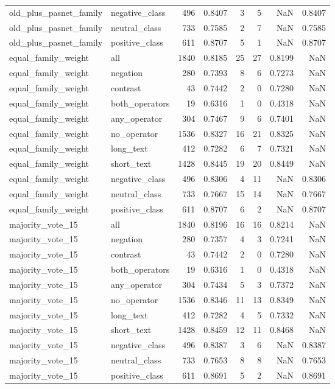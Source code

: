 \begin{tabular}{llrrrrrr}
old\_plus\_pasnet\_family & negative\_class & 496 & 0.8407 & 3 & 5 & NaN & 0.8407 \\
old\_plus\_pasnet\_family & neutral\_class & 733 & 0.7585 & 2 & 7 & NaN & 0.7585 \\
old\_plus\_pasnet\_family & positive\_class & 611 & 0.8707 & 5 & 1 & NaN & 0.8707 \\
equal\_family\_weight & all & 1840 & 0.8185 & 25 & 27 & 0.8199 & NaN \\
equal\_family\_weight & negation & 280 & 0.7393 & 8 & 6 & 0.7273 & NaN \\
equal\_family\_weight & contrast & 43 & 0.7442 & 2 & 0 & 0.7280 & NaN \\
equal\_family\_weight & both\_operators & 19 & 0.6316 & 1 & 0 & 0.4318 & NaN \\
equal\_family\_weight & any\_operator & 304 & 0.7467 & 9 & 6 & 0.7401 & NaN \\
equal\_family\_weight & no\_operator & 1536 & 0.8327 & 16 & 21 & 0.8325 & NaN \\
equal\_family\_weight & long\_text & 412 & 0.7282 & 6 & 7 & 0.7321 & NaN \\
equal\_family\_weight & short\_text & 1428 & 0.8445 & 19 & 20 & 0.8449 & NaN \\
equal\_family\_weight & negative\_class & 496 & 0.8306 & 4 & 11 & NaN & 0.8306 \\
equal\_family\_weight & neutral\_class & 733 & 0.7667 & 15 & 14 & NaN & 0.7667 \\
equal\_family\_weight & positive\_class & 611 & 0.8707 & 6 & 2 & NaN & 0.8707 \\
majority\_vote\_15 & all & 1840 & 0.8196 & 16 & 16 & 0.8214 & NaN \\
majority\_vote\_15 & negation & 280 & 0.7357 & 4 & 3 & 0.7241 & NaN \\
majority\_vote\_15 & contrast & 43 & 0.7442 & 2 & 0 & 0.7280 & NaN \\
majority\_vote\_15 & both\_operators & 19 & 0.6316 & 1 & 0 & 0.4318 & NaN \\
majority\_vote\_15 & any\_operator & 304 & 0.7434 & 5 & 3 & 0.7372 & NaN \\
majority\_vote\_15 & no\_operator & 1536 & 0.8346 & 11 & 13 & 0.8349 & NaN \\
majority\_vote\_15 & long\_text & 412 & 0.7282 & 4 & 5 & 0.7332 & NaN \\
majority\_vote\_15 & short\_text & 1428 & 0.8459 & 12 & 11 & 0.8468 & NaN \\
majority\_vote\_15 & negative\_class & 496 & 0.8387 & 3 & 6 & NaN & 0.8387 \\
majority\_vote\_15 & neutral\_class & 733 & 0.7653 & 8 & 8 & NaN & 0.7653 \\
majority\_vote\_15 & positive\_class & 611 & 0.8691 & 5 & 2 & NaN & 0.8691 \\
\bottomrule
\end{tabular}
